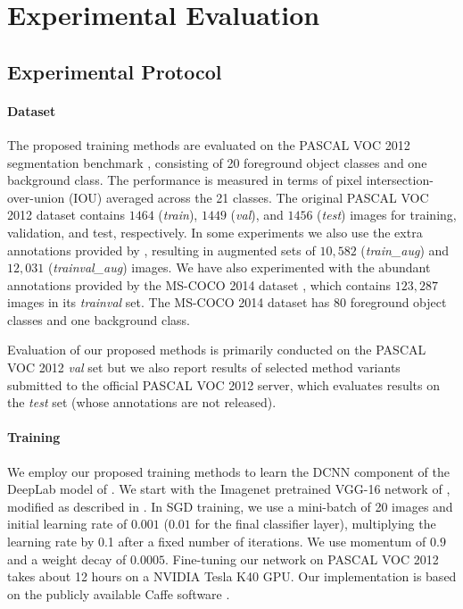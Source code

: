 \section{Experimental Evaluation}
\label{sec:experiments}

\subsection{Experimental Protocol}

\paragraph{Dataset} 

The proposed training methods are evaluated on the PASCAL
VOC 2012 segmentation benchmark \citep{everingham2014pascal},
consisting of 20 foreground object classes and one background
class. The performance is measured in terms of pixel
intersection-over-union (IOU) averaged across the 21 classes. The
original PASCAL VOC 2012 dataset contains $1464$ (\textsl{train}),
$1449$ (\textsl{val}), and $1456$ (\textsl{test}) images for training,
validation, and test, respectively. In some experiments we also use
the extra annotations provided by \citet{hariharan2011semantic},
resulting in augmented sets of $10,582$ (\textsl{train\_aug}) and
$12,031$ (\textsl{trainval\_aug}) images. We have also experimented
with the abundant annotations provided by the MS-COCO 2014 dataset
\citep{lin2014microsoft}, which contains $123,287$ images in its
\textsl{trainval} set. The MS-COCO 2014 dataset has $80$ foreground
object classes and one background class.

Evaluation of our proposed methods is primarily conducted on the
PASCAL VOC 2012 \textsl{val} set but we also report results of selected
method variants submitted to the official PASCAL VOC 2012 server, which
evaluates results on the \textsl{test} set (whose annotations are not
released).

\paragraph{Training}

We employ our proposed training methods to learn the DCNN component of
the DeepLab model of \citet{chen2014semantic}. We start with the
Imagenet pretrained VGG-16 network of \citet{simonyan2014very},
modified as described in \citet{chen2014semantic}. In SGD training, we
use a mini-batch of 20 images and initial learning rate of $0.001$
($0.01$ for the final classifier layer), multiplying the learning rate
by 0.1 after a fixed number of iterations. We use momentum of $0.9$
and a weight decay of $0.0005$. Fine-tuning our network on PASCAL VOC
2012 takes about 12 hours on a NVIDIA Tesla K40 GPU. Our
implementation is based on the publicly available Caffe software
\citep{jia2014caffe}.

